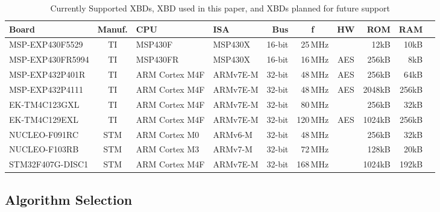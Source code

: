 \documentclass[10pt]{article}
\newcommand{\thb}[1]{\multicolumn{1}{c}{\textbf{#1}}}
\begin{document}
\begin{table}[ht]\setlength{\tabcolsep}{3pt}
  \caption{Currently Supported XBDs, {\color{blue}XBD used in this paper}, and {\color{purple}XBDs planned for future support}}\label{tab:XBDs}
    \begin{tabular}{l|c|ll|rrc|rr|r}
    \textbf{Board}   & \textbf{Manuf.}&\textbf{CPU}&\textbf{ISA}&\textbf{Bus}&\thb{f}&\textbf{HW}&\textbf{ROM}&\textbf{RAM} \\ \hline
    MSP-EXP430F5529  & TI        & MSP430F        &  MSP430X    & 16-bit &  25\,MHz &     &   12kB &  10kB  \\
    MSP-EXP430FR5994 & TI        & MSP430FR       &  MSP430X    & 16-bit &  16\,MHz & AES &  256kB &   8kB  \\
    MSP-EXP432P401R  & TI        & ARM Cortex M4F &  ARMv7E-M   & 32-bit &  48\,MHz & AES &  256kB &  64kB  \\
    \color{purple}MSP-EXP432P4111  & TI        & ARM Cortex M4F &  ARMv7E-M   & 32-bit &  48\,MHz & AES & 2048kB & 256kB  \\
    \color{blue}EK-TM4C123GXL    & TI        & ARM Cortex M4F &  ARMv7E-M   & 32-bit &  80\,MHz &     &  256kB &  32kB  \\ 
    \color{purple}EK-TM4C129EXL    & TI        & ARM Cortex M4F &  ARMv7E-M   & 32-bit & 120\,MHz & AES & 1024kB & 256kB  \\ 
    NUCLEO-F091RC    & STM       & ARM Cortex M0  &  ARMv6-M    & 32-bit &  48\,MHz &     &  256kB &  32kB  \\
    NUCLEO-F103RB    & STM       & ARM Cortex M3  &  ARMv7-M    & 32-bit &  72\,MHz &     &  128kB &  20kB  \\
    \color{purple}STM32F407G-DISC1 & STM       & ARM Cortex M4F &  ARMv7E-M   & 32-bit & 168\,MHz &     & 1024kB & 192kB  \\
    \end{tabular}
\end{table}


\subsection{Algorithm Selection}
\end{document}
